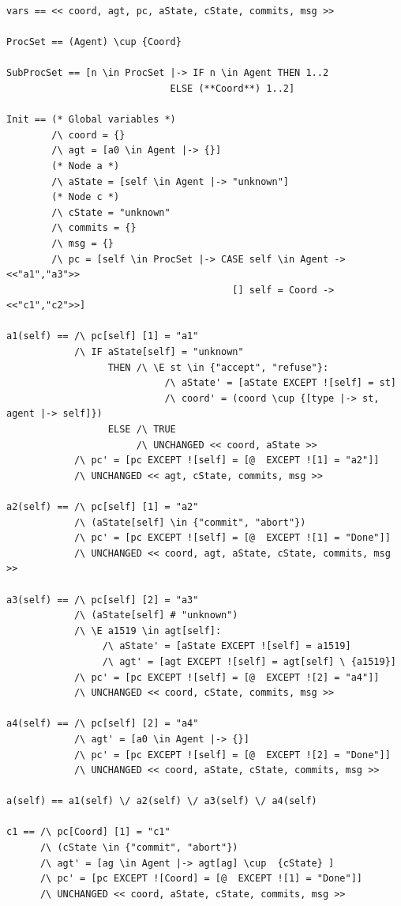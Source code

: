 \documentclass{thesul}
\begin{document}
\begin{appendices}
\begin{lstlisting}[caption = TLA+ translation for Sub-Processes, frame = tlrb, firstnumber = 1]
vars == << coord, agt, pc, aState, cState, commits, msg >>

ProcSet == (Agent) \cup {Coord}

SubProcSet == [n \in ProcSet |-> IF n \in Agent THEN 1..2
                             ELSE (**Coord**) 1..2]

Init == (* Global variables *)
        /\ coord = {}
        /\ agt = [a0 \in Agent |-> {}]
        (* Node a *)
        /\ aState = [self \in Agent |-> "unknown"]
        (* Node c *)
        /\ cState = "unknown"
        /\ commits = {}
        /\ msg = {}
        /\ pc = [self \in ProcSet |-> CASE self \in Agent -> <<"a1","a3">>
                                        [] self = Coord -> <<"c1","c2">>]

a1(self) == /\ pc[self] [1] = "a1"
            /\ IF aState[self] = "unknown"
                  THEN /\ \E st \in {"accept", "refuse"}:
                            /\ aState' = [aState EXCEPT ![self] = st]
                            /\ coord' = (coord \cup {[type |-> st, agent |-> self]})
                  ELSE /\ TRUE
                       /\ UNCHANGED << coord, aState >>
            /\ pc' = [pc EXCEPT ![self] = [@  EXCEPT ![1] = "a2"]]
            /\ UNCHANGED << agt, cState, commits, msg >>

a2(self) == /\ pc[self] [1] = "a2"
            /\ (aState[self] \in {"commit", "abort"})
            /\ pc' = [pc EXCEPT ![self] = [@  EXCEPT ![1] = "Done"]]
            /\ UNCHANGED << coord, agt, aState, cState, commits, msg >>

a3(self) == /\ pc[self] [2] = "a3"
            /\ (aState[self] # "unknown")
            /\ \E a1519 \in agt[self]:
                 /\ aState' = [aState EXCEPT ![self] = a1519]
                 /\ agt' = [agt EXCEPT ![self] = agt[self] \ {a1519}]
            /\ pc' = [pc EXCEPT ![self] = [@  EXCEPT ![2] = "a4"]]
            /\ UNCHANGED << coord, cState, commits, msg >>

a4(self) == /\ pc[self] [2] = "a4"
            /\ agt' = [a0 \in Agent |-> {}]
            /\ pc' = [pc EXCEPT ![self] = [@  EXCEPT ![2] = "Done"]]
            /\ UNCHANGED << coord, aState, cState, commits, msg >>

a(self) == a1(self) \/ a2(self) \/ a3(self) \/ a4(self)

c1 == /\ pc[Coord] [1] = "c1"
      /\ (cState \in {"commit", "abort"})
      /\ agt' = [ag \in Agent |-> agt[ag] \cup  {cState} ]
      /\ pc' = [pc EXCEPT ![Coord] = [@  EXCEPT ![1] = "Done"]]
      /\ UNCHANGED << coord, aState, cState, commits, msg >>


\end{lstlisting}
\end{appendices}
\end{document}

